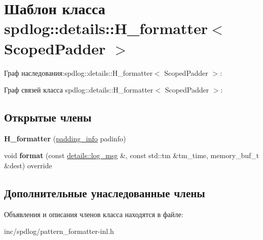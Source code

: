 \hypertarget{classspdlog_1_1details_1_1H__formatter}{}\section{Шаблон класса spdlog\+:\+:details\+:\+:H\+\_\+formatter$<$ Scoped\+Padder $>$}
\label{classspdlog_1_1details_1_1H__formatter}


Граф наследования\+:spdlog\+:\+:details\+:\+:H\+\_\+formatter$<$ Scoped\+Padder $>$\+:


Граф связей класса spdlog\+:\+:details\+:\+:H\+\_\+formatter$<$ Scoped\+Padder $>$\+:
\subsection*{Открытые члены}
\begin{DoxyCompactItemize}
\item 
\mbox{\label{classspdlog_1_1details_1_1H__formatter_af6d9a10bec349feb321b42deeb854574}} 
{\bfseries H\+\_\+formatter} (\hyperlink{structspdlog_1_1details_1_1padding__info}{padding\+\_\+info} padinfo)
\item 
\mbox{\label{classspdlog_1_1details_1_1H__formatter_af130a49202b8ac6599fa98bcdaa7364e}} 
void {\bfseries format} (const \hyperlink{structspdlog_1_1details_1_1log__msg}{details\+::log\+\_\+msg} \&, const std\+::tm \&tm\+\_\+time, memory\+\_\+buf\+\_\+t \&dest) override
\end{DoxyCompactItemize}
\subsection*{Дополнительные унаследованные члены}


Объявления и описания членов класса находятся в файле\+:\begin{DoxyCompactItemize}
\item 
inc/spdlog/pattern\+\_\+formatter-\/inl.\+h\end{DoxyCompactItemize}
